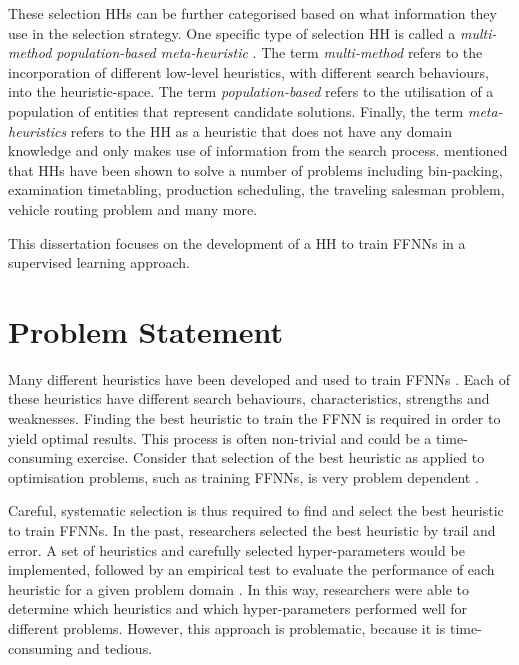 These selection \acp{HH} can be further categorised based on what information
they use in the selection strategy. One specific type of selection \ac{HH} is
called a \textit{multi-method
      population-based meta-heuristic}
\cite{ref:vanderstockt:2018}. The term \textit{multi-method}
refers to the incorporation of different low-level heuristics, with different
search behaviours, into the heuristic-space. The term \textit{population-based}
refers to the utilisation of a population of entities that represent candidate
solutions. Finally, the term \textit{meta-heuristics}
refers to the \ac{HH} as a heuristic that does not have any domain knowledge and
only makes use of information from the search process.
\citeauthor{ref:grobler:2015} \cite{ref:grobler:2015} mentioned that \acp{HH}
have been shown to solve a number of problems including bin-packing, examination
timetabling, production scheduling, the traveling salesman problem, vehicle
routing problem and many more.

This dissertation focuses on the development of a \ac{HH} to train \acp{FFNN} in a
supervised learning approach.

\section{Problem Statement}
\label{sec:introduction:problem}

Many different heuristics have been developed and used to train \acp{FFNN}
\cite{ref:gudise:2003, ref:rakitianskaia:2012, ref:montana:1989}. Each of these heuristics have different search behaviours, characteristics, strengths and weaknesses. Finding the best heuristic to train the \ac{FFNN} is required in order to yield optimal results. This
process is often non-trivial and could be a time-consuming exercise.  Consider
that selection of the best heuristic as applied to optimisation problems, such
as training \acp{FFNN}, is very problem dependent \cite{ref:allen:1996,
      ref:drake:2020, ref:pillay:2018}.

Careful, systematic selection is thus required to find and select the best
heuristic to train \acp{FFNN}. In the past, researchers selected the best
heuristic by trail and error. A set of heuristics and carefully selected
hyper-parameters would be implemented, followed by an empirical test to evaluate
the performance of each heuristic for a given problem domain
\cite{ref:pillay:2015}. In this way, researchers were able to determine which
heuristics and which hyper-parameters performed well for different problems.
However, this approach is problematic, because it is time-consuming and tedious.


